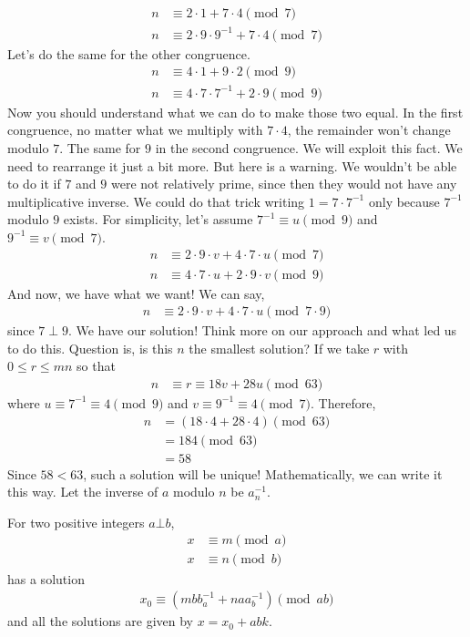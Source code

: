 	\begin{align*}
		n & \equiv2\cdot1+7\cdot4\pmod7\\
		n & \equiv2\cdot9\cdot9^{-1}+7\cdot4\pmod{7}
	\end{align*}
Let's do the same for the other congruence.
	\begin{align*}
		n & \equiv4\cdot1+9\cdot2\pmod{9}\\
		n & \equiv4\cdot7\cdot7^{-1}+2\cdot9\pmod{9}
	\end{align*}
Now you should understand what we can do to make those two equal. In the first congruence, no matter what we multiply with $7\cdot4$, the remainder won't change modulo $7$. The same for $9$ in the second congruence. We will exploit this fact. We need to rearrange it just a bit more. But here is a warning. We wouldn't be able to do it if $7$ and $9$ were not relatively prime, since then they would not have any multiplicative inverse. We could do that trick writing $1=7\cdot7^{-1}$ only because $7^{-1}$ modulo $9$ exists. For simplicity, let's assume $7^{-1}\equiv u\pmod{9}$ and $9^{-1}\equiv v\pmod{7}$.
	\begin{align*}
		n & \equiv2\cdot9\cdot v+4\cdot7\cdot u\pmod{7}\\
		n & \equiv4\cdot7\cdot u+2\cdot9\cdot v\pmod{9}
	\end{align*}
And now, we have what we want! We can say,
	\begin{align*}
		n & \equiv2\cdot9\cdot v+4\cdot7\cdot u\pmod{7\cdot9}
	\end{align*}
since $7 \perp 9$. We have our solution! Think more on our approach and what led us to do this. Question is, is this $n$ the smallest solution? If we take $r$ with $0\leq r\leq mn$ so that
	\begin{align*}
		n & \equiv r\equiv18v+28u\pmod{63}
	\end{align*}
where $u\equiv7^{-1}\equiv4\pmod9$ and $v\equiv9^{-1}\equiv4\pmod 7$. Therefore,
	\begin{align*}
		n
			& = (18\cdot4+28\cdot4)\pmod{63}\\
			& =184\pmod{63}\\
			& =58
	\end{align*}
Since $58<63$, such a solution will be unique! Mathematically, we can write it this way. Let the inverse of $a$ modulo $n$ be $a^{-1}_n$.
	\begin{theorem}
		For two positive integers $a\bot b$,
			\begin{align*}
				x & \equiv m\pmod a\\
				x & \equiv n\pmod b
			\end{align*}
		has a solution
			\begin{align*}
				x_0 \equiv (mbb^{-1}_a+naa^{-1}_b)\pmod{ab}
			\end{align*}
		and all the solutions are given by $x=x_0+abk$.
	\end{theorem}
